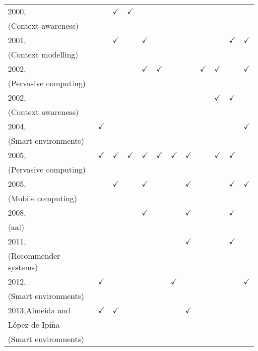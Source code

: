 \begin{table}
\begin{tabular}{l c c c c c c c c c c c }
    2000,~\citet{chen_survey_2000} 		&  & $\checkmark$ & $\checkmark$ &  &  &  &  &  &  &  &  \\
    (Context awareness)\\
    2001,~\citet{jameson_modelling_2001} 	&  & $\checkmark$ &  & $\checkmark$ &  &  &  &  &  & $\checkmark$ & $\checkmark$ \\
    (Context modelling)\\
    2002,~\citet{henricksen_modeling_2002} 	&   &  &  & $\checkmark$ & $\checkmark$ &  &  & $\checkmark$ & $\checkmark$ &  & $\checkmark$ \\
    (Pervasive computing)\\
    2002,~\citet{held_modeling_2002} 		&  &  &  &  &  &  &  &  & $\checkmark$ & $\checkmark$  &  \\
    (Context awareness)\\
    2004,~\citet{gu_toward_2004} 		& $\checkmark$ &  &  &  &  &  &  &  &  &  & $\checkmark$ \\
    (Smart environments)\\
    2005,~\citet{chen_using_2005} 		& $\checkmark$ & $\checkmark$ & $\checkmark$ & $\checkmark$ & $\checkmark$ & $\checkmark$ & $\checkmark$ &  & $\checkmark$ & $\checkmark$ & \\
    (Pervasive computing)\\
    2005,~\citet{yamabe_citron_2005} 		&  & $\checkmark$ &  & $\checkmark$ &  &  & $\checkmark$ &  &  & $\checkmark$ & $\checkmark$ \\
    (Mobile computing)\\
    2008,~\citet{wood_context_aware_2008} 	&  &  &  & $\checkmark$ &  &  & $\checkmark$ &  &  & $\checkmark$ &  \\
    (\ac{aal})\\
    2011,~\citet{baltrunas_incarmusic_2011} 	&  &  &  &  &  &  & $\checkmark$ &  &  & $\checkmark$ &  \\ 
    (Recommender systems)\\
    2012,~\citet{mcavoy_ontology_based_2012} 	& $\checkmark$ &  &  &  &  & $\checkmark$ &  &  &  &  & $\checkmark$  \\
    (Smart environments)\\
    2013,Almeida and	& $\checkmark$ & $\checkmark$ &  &  &  &  & $\checkmark$ &  &  &  &  \\
    López-de-Ipiña~\citep{almeida_assessing_2012}\\
    (Smart environments)\\
\hline

\end{tabular}
\end{table}